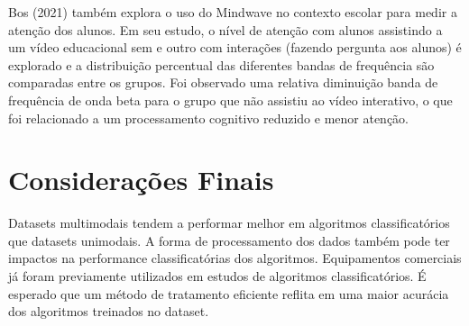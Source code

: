 Bos (2021) também explora o uso do Mindwave no contexto escolar para medir a atenção dos alunos. Em seu estudo, 
o nível de atenção com alunos assistindo a um vídeo educacional sem e outro com interações (fazendo pergunta aos alunos)
 é explorado e a distribuição percentual das diferentes bandas de frequência são comparadas entre os grupos. Foi 
 observado uma relativa diminuição banda de frequência de onda beta para o grupo que não assistiu ao vídeo interativo, 
 o que foi relacionado a um processamento cognitivo reduzido e menor atenção.


 



\section{Considerações Finais}
Datasets multimodais tendem a performar melhor em algoritmos classificatórios que datasets unimodais. 
A forma de processamento dos dados também pode ter impactos na performance classificatórias dos algoritmos. 
Equipamentos comerciais já foram previamente utilizados em estudos de algoritmos classificatórios. 
É esperado que um método de tratamento eficiente reflita em uma maior acurácia dos algoritmos treinados no dataset. 

